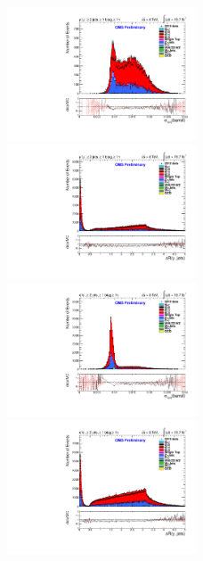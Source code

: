 \documentclass[oneside, a4paper, 11pt, ]{report}
\begin{document}
\begin{figure}
\includegraphics[width=0.5\textwidth]{Plots/ControlPlots/TTbarDiLeptonAnalysis/MuMu/Photons/AllPhotons/Photon_sigma_ietaieta_barrel_splitTTbar_ratio.pdf}
\includegraphics[width=0.5\textwidth]{Plots/ControlPlots/TTbarDiLeptonAnalysis/MuMu/Photons/AllPhotons/Photon_deltaR_jets_splitTTbar_ratio.pdf}\\
\includegraphics[width=0.5\textwidth]{Plots/ControlPlots/TTbarDiLeptonAnalysis/EE/Photons/AllPhotons/Photon_sigma_ietaieta_barrel_splitTTbar_ratio.pdf}
\includegraphics[width=0.5\textwidth]{Plots/ControlPlots/TTbarDiLeptonAnalysis/EE/Photons/AllPhotons/Photon_deltaR_jets_splitTTbar_ratio.pdf}\\

\end{figure}
\end{document}
